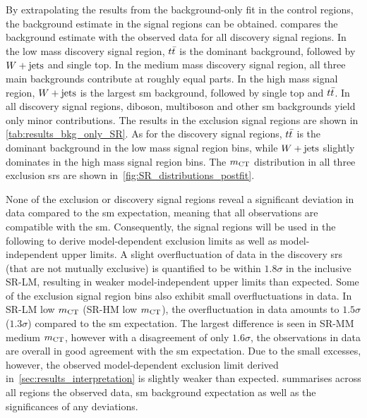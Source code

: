 By extrapolating the results from the background-only fit in the control regions, the background estimate in the signal regions can be obtained.  compares the background estimate with the observed data for all discovery signal regions. In the low mass discovery signal region, $t\bar{t}$ is the dominant background, followed by $W+\mathrm{jets}$ and single top. In the medium mass discovery signal region, all three main backgrounds contribute at roughly equal parts. In the high mass signal region, $W+\mathrm{jets}$ is the largest \gls{sm} background, followed by single top and $t\bar{t}$. In all discovery signal regions, diboson, multiboson and other \gls{sm} backgrounds yield only minor contributions. The results in the exclusion signal regions are shown in \cref{tab:results_bkg_only_SR}. As for the discovery signal regions, $t\bar{t}$ is the dominant background in the low mass signal region bins, while $W+\mathrm{jets}$ slightly dominates in the high mass signal region bins. The $m_{\textrm{CT}}$ distribution in all three exclusion \glspl{sr} are shown in~\cref{fig:SR_distributions_postfit}.

None of the exclusion or discovery signal regions reveal a significant deviation in data compared to the \gls{sm} expectation, meaning that all observations are compatible with the \gls{sm}. Consequently, the signal regions will be used in the following to derive model-dependent exclusion limits as well as model-independent upper limits. A slight overfluctuation of data in the discovery \glspl{sr} (that are not mutually exclusive) is quantified to be within $1.8\sigma$ in the inclusive SR-LM, resulting in weaker model-independent upper limits than expected. Some of the exclusion signal region bins also exhibit small overfluctuations in data. In SR-LM low $m_{\textrm{CT}}$ (SR-HM low $m_{\textrm{CT}}$), the overfluctuation in data amounts to $1.5\sigma$ ($1.3\sigma$) compared to the \gls{sm} expectation. The largest difference is seen in SR-MM medium $m_{\textrm{CT}}$, however with a disagreement of only $1.6\sigma$, the observations in data are overall in good agreement with the \gls{sm} expectation. Due to the small excesses, however, the observed model-dependent exclusion limit derived in~\cref{sec:results_interpretation} is slightly weaker than expected.  summarises across all regions the observed data, \gls{sm} background expectation as well as the significances of any deviations.





